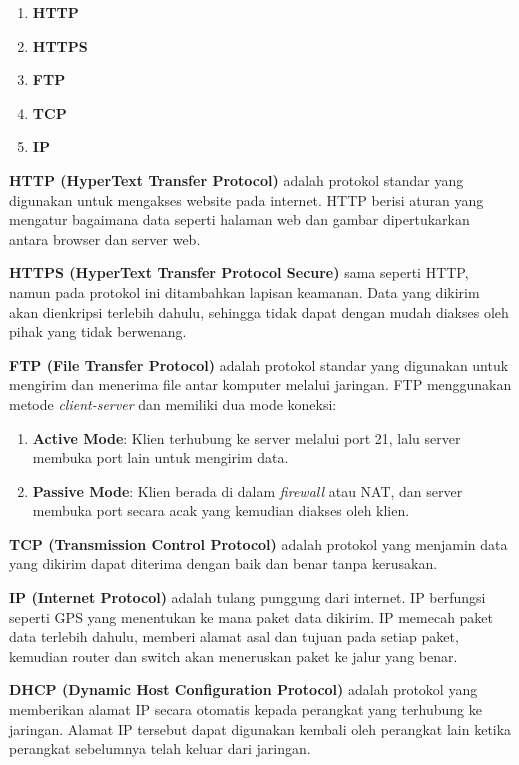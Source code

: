 \begin{enumerate}
    \item \textbf{HTTP}
    \item \textbf{HTTPS}
    \item \textbf{FTP}
    \item \textbf{TCP}
    \item \textbf{IP}
\end{enumerate}

\textbf{HTTP (HyperText Transfer Protocol)} adalah protokol standar yang digunakan untuk mengakses website pada internet. HTTP berisi aturan yang mengatur bagaimana data seperti halaman web dan gambar dipertukarkan antara browser dan server web.

\textbf{HTTPS (HyperText Transfer Protocol Secure)} sama seperti HTTP, namun pada protokol ini ditambahkan lapisan keamanan. Data yang dikirim akan dienkripsi terlebih dahulu, sehingga tidak dapat dengan mudah diakses oleh pihak yang tidak berwenang.

\textbf{FTP (File Transfer Protocol)} adalah protokol standar yang digunakan untuk mengirim dan menerima file antar komputer melalui jaringan. FTP menggunakan metode \textit{client-server} dan memiliki dua mode koneksi:
\begin{enumerate}
    \item \textbf{Active Mode}: Klien terhubung ke server melalui port 21, lalu server membuka port lain untuk mengirim data.
    \item \textbf{Passive Mode}: Klien berada di dalam \textit{firewall} atau NAT, dan server membuka port secara acak yang kemudian diakses oleh klien.
\end{enumerate}

\textbf{TCP (Transmission Control Protocol)} adalah protokol yang menjamin data yang dikirim dapat diterima dengan baik dan benar tanpa kerusakan.

\textbf{IP (Internet Protocol)} adalah tulang punggung dari internet. IP berfungsi seperti GPS yang menentukan ke mana paket data dikirim. IP memecah paket data terlebih dahulu, memberi alamat asal dan tujuan pada setiap paket, kemudian router dan switch akan meneruskan paket ke jalur yang benar.

\textbf{DHCP (Dynamic Host Configuration Protocol)} adalah protokol yang memberikan alamat IP secara otomatis kepada perangkat yang terhubung ke jaringan. Alamat IP tersebut dapat digunakan kembali oleh perangkat lain ketika perangkat sebelumnya telah keluar dari jaringan.


